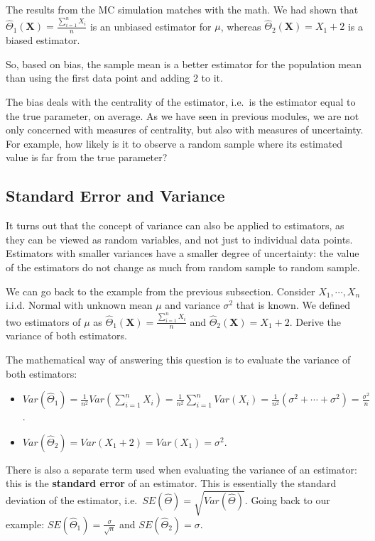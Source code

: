 \documentclass[
]{book}
\begin{document}
The results from the MC simulation matches with the math. We had shown that \(\hat{\Theta}_1(\boldsymbol{X}) = \frac{\sum_{i=1}^n X_i}{n}\) is an unbiased estimator for \(\mu\), whereas \(\hat{\Theta}_2(\boldsymbol{X}) = X_1 + 2\) is a biased estimator.

So, based on bias, the sample mean is a better estimator for the population mean than using the first data point and adding 2 to it.

The bias deals with the centrality of the estimator, i.e.~is the estimator equal to the true parameter, on average. As we have seen in previous modules, we are not only concerned with measures of centrality, but also with measures of uncertainty. For example, how likely is it to observe a random sample where its estimated value is far from the true parameter?

\subsection{Standard Error and Variance}\label{standard-error-and-variance}

It turns out that the concept of variance can also be applied to estimators, as they can be viewed as random variables, and not just to individual data points. Estimators with smaller variances have a smaller degree of uncertainty: the value of the estimators do not change as much from random sample to random sample.

We can go back to the example from the previous subsection. Consider \(X_1, \cdots, X_n\) i.i.d. Normal with unknown mean \(\mu\) and variance \(\sigma^2\) that is known. We defined two estimators of \(\mu\) as \(\hat{\Theta}_1(\boldsymbol{X}) = \frac{\sum_{i=1}^n X_i}{n}\) and \(\hat{\Theta}_2(\boldsymbol{X}) = X_1 + 2\). Derive the variance of both estimators.

The mathematical way of answering this question is to evaluate the variance of both estimators:

\begin{itemize}
\item
  \(Var(\hat{\Theta}_1) = \frac{1}{n^2}Var(\sum_{i=1}^n X_i) = \frac{1}{n^2} \sum_{i=1}^n Var(X_i) = \frac{1}{n^2} (\sigma^2 + \cdots + \sigma^2) = \frac{\sigma^2}{n}\).
\item
  \(Var(\hat{\Theta}_2) = Var(X_1 + 2) = Var(X_1) = \sigma^2\).
\end{itemize}

There is also a separate term used when evaluating the variance of an estimator: this is the \textbf{standard error} of an estimator. This is essentially the standard deviation of the estimator, i.e.~\(SE(\hat{\Theta}) = \sqrt{Var(\hat{\Theta})}\). Going back to our example: \(SE(\hat{\Theta}_1) = \frac{\sigma}{\sqrt{n}}\) and \(SE(\hat{\Theta}_2) = \sigma\).
\end{document}
